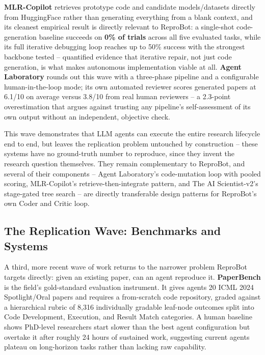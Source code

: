 \documentclass[10pt,twocolumn]{article}
\begin{document}
\textbf{MLR-Copilot} \cite{li2024mlrcopilot} retrieves prototype code and candidate
models/datasets directly from HuggingFace rather than generating everything from a blank
context, and its cleanest empirical result is directly relevant to ReproBot: a
single-shot code-generation baseline succeeds on \textbf{0\% of trials} across all five
evaluated tasks, while its full iterative debugging loop reaches up to 50\% success with
the strongest backbone tested -- quantified evidence that iterative repair, not just code
generation, is what makes autonomous implementation viable at all.
\textbf{Agent Laboratory} \cite{schmidgall2025agentlab} rounds out this wave with a
three-phase pipeline and a configurable human-in-the-loop mode; its own automated
reviewer scores generated papers at 6.1/10 on average versus 3.8/10 from real human
reviewers -- a 2.3-point overestimation that argues against trusting any pipeline's
self-assessment of its own output without an independent, objective check.

This wave demonstrates that LLM agents can execute the entire research lifecycle end to
end, but leaves the replication problem untouched by construction -- these systems have
no ground-truth number to reproduce, since they invent the research question themselves.
They remain complementary to ReproBot, and several of their components -- Agent
Laboratory's code-mutation loop with pooled scoring, MLR-Copilot's
retrieve-then-integrate pattern, and The AI Scientist-v2's stage-gated tree search --
are directly transferable design patterns for ReproBot's own Coder and Critic loop.

\subsection{The Replication Wave: Benchmarks and Systems}
\label{sec:replication-wave}

A third, more recent wave of work returns to the narrower problem ReproBot targets
directly: given an existing paper, can an agent reproduce it. \textbf{PaperBench}
\cite{starace2025paperbench} is the field's gold-standard evaluation instrument. It
gives agents 20 ICML 2024 Spotlight/Oral papers and requires a from-scratch code
repository, graded against a hierarchical rubric of 8,316 individually gradable
leaf-node outcomes split into Code Development, Execution, and Result Match categories.
A human baseline shows PhD-level researchers start slower than the best agent
configuration but overtake it after roughly 24 hours of sustained work, suggesting
current agents plateau on long-horizon tasks rather than lacking raw capability.
\end{document}
